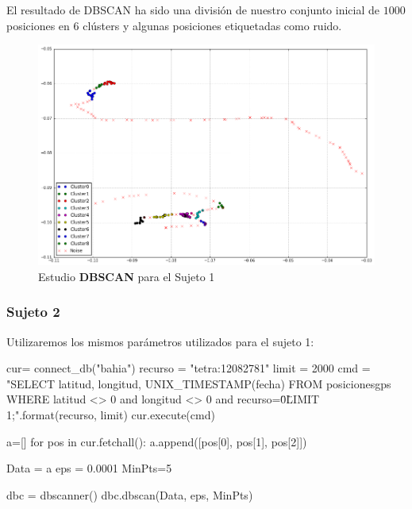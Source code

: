 \documentclass[a4paper, 12pt]{article}
\begin{document}
El resultado de DBSCAN ha sido una divisi\'on de nuestro conjunto inicial de $1000$ posiciones en 6 cl\'usters y algunas posiciones etiquetadas como ruido.


\begin{figure}[H]
	\includegraphics[width=15cm]{../comparativa/dbscanSujeto1.png}
	\caption{Estudio \textbf{DBSCAN} para el Sujeto 1}
\end{figure}


\subsubsection{Sujeto 2}

Utilizaremos los mismos par\'ametros utilizados para el sujeto 1:\\

\begin{python}
cur= connect_db("bahia")
recurso = "tetra:12082781"
limit = 2000
cmd = "SELECT latitud, longitud, UNIX_TIMESTAMP(fecha) 
	FROM posicionesgps 
	WHERE latitud <> 0 and longitud <> 0 and recurso=\"{0}\" 
	LIMIT {1};".format(recurso, limit)
cur.execute(cmd)

a=[]
for pos in cur.fetchall():
    a.append([pos[0], pos[1], pos[2]])

Data = a
eps = 0.0001
MinPts=5

dbc = dbscanner()
dbc.dbscan(Data, eps, MinPts)
\end{python}
\end{document}
